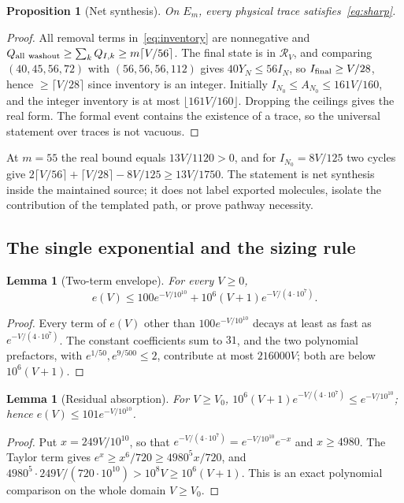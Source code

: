 \documentclass[11pt,a4paper]{article}
\theoremstyle{plain}
\newtheorem{proposition}[theorem]{Proposition}
\newtheorem{lemma}[theorem]{Lemma}
\theoremstyle{definition}
\theoremstyle{remark}
\newcommand{\cR}{\mathcal R}
\newcommand{\Iv}{I}
\begin{document}
\begin{proposition}[Net synthesis]\label{prop:synthesis}
On $E_m$, every physical trace satisfies~\eqref{eq:sharp}.
\end{proposition}
\begin{proof}
All removal terms in~\eqref{eq:inventory} are nonnegative and $Q_{\rm all\ washout}\ge\sum_kQ_{I,k}\ge m\lceil V/56\rceil$. The final state is in $\cR_V$, and comparing $(40,45,56,72)$ with $(56,56,56,112)$ gives $40Y_N\le56\Iv_N$, so $\Iv_{\rm final}\ge V/28$, hence $\ge\lceil V/28\rceil$ since inventory is an integer. Initially $\Iv_{N_0}\le A_{N_0}\le161V/160$, and the integer inventory is at most $\lfloor161V/160\rfloor$. Dropping the ceilings gives the real form. The formal event contains the existence of a trace, so the universal statement over traces is not vacuous.
\end{proof}
At $m=55$ the real bound equals $13V/1120>0$, and for $\Iv_{N_0}=8V/125$ two cycles give $2\lceil V/56\rceil+\lceil V/28\rceil-8V/125\ge13V/1750$. The statement is net synthesis inside the maintained source; it does not label exported molecules, isolate the contribution of the templated path, or prove pathway necessity.

\subsection{The single exponential and the sizing rule}
\begin{lemma}[Two-term envelope]\label{lem:envelope}
For every $V\ge0$,
\begin{equation}\label{eq:envelope}
e(V)\le100e^{-V/10^{10}}+10^6(V+1)e^{-V/(4\cdot10^{7})}.
\end{equation}
\end{lemma}
\begin{proof}
Every term of $e(V)$ other than $100e^{-V/10^{10}}$ decays at least as fast as $e^{-V/(4\cdot10^7)}$. The constant coefficients sum to $31$, and the two polynomial prefactors, with $e^{1/50},e^{9/500}\le2$, contribute at most $216000V$; both are below $10^6(V+1)$.
\end{proof}

\begin{lemma}[Residual absorption]\label{lem:absorb}
For $V\ge V_0$, $10^6(V+1)e^{-V/(4\cdot10^7)}\le e^{-V/10^{10}}$; hence $e(V)\le101e^{-V/10^{10}}$.
\end{lemma}
\begin{proof}
Put $x=249V/10^{10}$, so that $e^{-V/(4\cdot10^7)}=e^{-V/10^{10}}e^{-x}$ and $x\ge4980$. The Taylor term gives $e^x\ge x^6/720\ge4980^5x/720$, and $4980^5\cdot249V/(720\cdot10^{10})>10^8V\ge10^6(V+1)$. This is an exact polynomial comparison on the whole domain $V\ge V_0$.
\end{proof}
\end{document}
